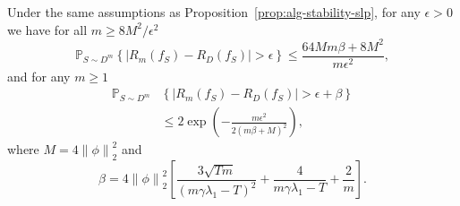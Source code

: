 \documentclass[letterpaper]{article} %
\begin{document}

\begin{theorem}\label{Thm:Gen_Error_Soft}
  Under the same assumptions as Proposition~\ref{prop:alg-stability-slp}, for any $\epsilon>0$ we have for all $m\geq 8M^2/\epsilon^2$
  \begin{equation}
    \label{eq:fraction-bounds-1}
    \mathbb{P}_{S\sim D^m} \left\{ \left| R_m \left( f_S \right)-R_D \left( f_S \right) \right| > \epsilon\right\}\leq \frac{64 Mm\beta+8M^2}{m\epsilon^2},
  \end{equation}
  and for any $m\geq 1$
  \begin{equation}
    \label{eq:exponential-bounds-1}
    \begin{aligned}
    \mathbb{P}_{S\sim D^m}&\left\{ \left| R_m \left( f_S \right)-R_D \left( f_S \right) \right| > \epsilon+\beta\right\}\\
    &\leq 2\exp \left( -\frac{m\epsilon^2}{2 \left( m\beta+M \right)^2} \right),
    \end{aligned}
  \end{equation}
  where $M=4\left\| \phi \right\|_2^2$ and
  \begin{equation*}
    \beta=4\left\| \phi \right\|_2^2\left[\frac{3\sqrt{Tm}}{\left( m\gamma\lambda_1-T \right)^2}+\frac{4}{m\gamma\lambda_1-T}+\frac{2}{m}\right].
  \end{equation*}
\end{theorem}

\end{document}
